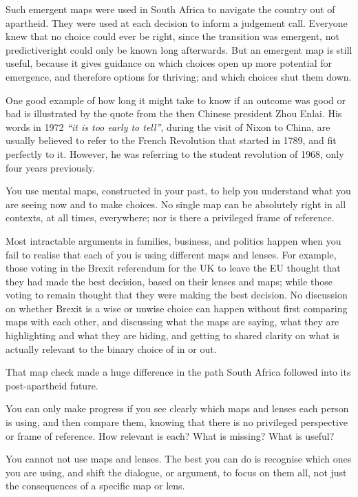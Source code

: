 Such emergent maps were used in South Africa to navigate the country out of apartheid. They were used at each decision to inform a judgement call. Everyone knew that no choice could ever be right, since the transition was emergent, not predictive\textemdash right could only be known long afterwards. But an emergent map is still useful, because it gives guidance on which choices open up more potential for emergence, and therefore options for thriving; and which choices shut them down.


One good example of how long it might take to know if an outcome was good or bad is illustrated by the quote from the then Chinese president Zhou Enlai. His words in 1972 \emph{“it is too early to tell”}, during the visit of Nixon to China, are usually believed to refer to the French Revolution that started in 1789, and fit perfectly to it. However, he was referring to the student revolution of 1968, only four years previously.


You use mental maps, constructed in your past, to help you understand what you are seeing now and to make choices. No single map can be absolutely right in all contexts, at all times, everywhere; nor is there a privileged frame of reference. 


Most intractable arguments in families, business, and politics happen when you fail to realise that each of you is using different maps and lenses. For example, those voting in the Brexit referendum for the UK to leave the EU thought that they had made the best decision, based on their lenses and maps; while those voting to remain thought that they were making the best decision. No discussion on whether Brexit is a wise or unwise choice can happen without first comparing maps with each other, and discussing what the maps are saying, what they are highlighting and what they are hiding, and getting to shared clarity on what is actually relevant to the binary choice of in or out. 


That map check made a huge difference in the path South Africa followed into its post-apartheid future.


You can only make progress if you see clearly which maps and lenses each person is using, and then compare them, knowing that there is no privileged perspective or frame of reference. How relevant is each? What is missing? What is useful?


You cannot not use maps and lenses. The best you can do is recognise which ones you are using, and shift the dialogue, or argument, to focus on them all, not just the consequences of a specific map or lens. 


